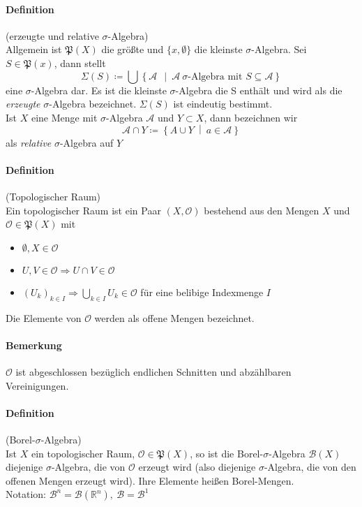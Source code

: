 \documentclass[12pt,a4paper,fleqn]{article}
\def\set#1{{\left\{ #1 \right\}}}
\def\Mid{\ \middle|\ }
\begin{document}
\paragraph{Definition}(erzeugte und relative $\sigma$-Algebra)\\
Allgemein ist $\mathfrak{P}(X)$ die größte und $\{x, \emptyset\}$ die kleinste $\sigma$-Algebra. Sei $S \in \mathfrak{P}(x)$, dann stellt
\begin{displaymath}
\Sigma(S) \coloneqq \bigcup \set{\mathcal{A}\ \Mid \mathcal{A}\ \sigma\text{-Algebra mit }S \subseteq \mathcal{A}}
\end{displaymath}
eine $\sigma$-Algebra dar. Es ist die kleinste $\sigma$-Algebra die S enthält und wird als die \textit{erzeugte} $\sigma$-Algebra bezeichnet. $\Sigma(S)$ ist eindeutig bestimmt.\\
Ist $X$ eine Menge mit $\sigma$-Algebra $\mathcal{A}$ und $Y \subset X$, dann bezeichnen wir 
\begin{displaymath}
\mathcal{A} \cap Y \coloneqq \set{A \cup Y \Mid a \in \mathcal{A}}
\end{displaymath}
als \textit{relative} $\sigma$-Algebra auf $Y$

\paragraph{Definition}(Topologischer Raum)\\
Ein topologischer Raum ist ein Paar $(X, \mathcal{O})$ bestehend aus den Mengen $X$ und $\mathcal{O} \in \mathfrak{P}(X)$ mit
\begin{itemize}
\item $\emptyset, X \in \mathcal{O}$
\item $U, V \in \mathcal{O} \Rightarrow U \cap V \in \mathcal{O}$
\item $(U_k)_{k \in I} \Rightarrow \bigcup_{k \in I} U_k \in \mathcal{O}$
für eine belibige Indexmenge $I$
\end{itemize} 
Die Elemente von $\mathcal{O}$ werden als offene Mengen bezeichnet.

\paragraph{Bemerkung} $\mathcal{O}$ ist abgeschlossen bezüglich endlichen Schnitten und abzählbaren Vereinigungen.

\paragraph{Definition}(Borel-$\sigma$-Algebra)\\
Ist $X$ ein topologischer Raum, $\mathcal{O} \in \mathfrak{P}(X)$, so ist die Borel-$\sigma$-Algebra $\mathcal{B}(X)$ diejenige $\sigma$-Algebra, die von $\mathcal{O}$ erzeugt wird (also diejenige $\sigma$-Algebra, die von den offenen Mengen erzeugt wird). Ihre Elemente heißen Borel-Mengen.\\
Notation:
$\mathcal{B}^n=\mathcal{B}(\mathbb{R}^n),\ \mathcal{B}=\mathcal{B}^1$
\end{document}
